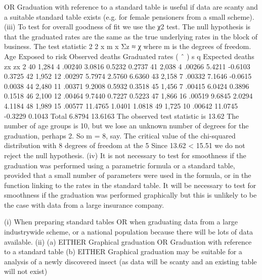 \documentclass[a4paper,12pt]{article}
\begin{document}
OR
Graduation with reference to a standard table is useful if data are scanty and a
suitable standard table exists (e.g. for female pensioners from a small scheme).
(iii) To test for overall goodness of fit we use the χ2 test.
The null hypothesis is that the graduated rates are the same as the true underlying
rates in the block of business.
The test statistic 2 2
x m
x
Σz ≈ χ where m is the degrees of freedom.
Age Exposed
to risk
Observed
deaths
Graduated
rates ( ˆ ) s q
Expected
deaths
zx zx
2
40 1,284 4 .00240 3.0816 0.5232 0.2737
41 2,038 4 .00266 5.4211 -0.6103 0.3725
42 1,952 12 .00297 5.7974 2.5760 6.6360
43 2,158 7 .00332 7.1646 -0.0615 0.0038
44 2,480 11 .00371 9.2008 0.5932 0.3518
45 1,456 7 .00415 6.0424 0.3896 0.1518
46 2,100 12 .00464 9.7440 0.7227 0.5223
47 1,866 16 .00519 9.6845 2.0294 4.1184
48 1,989 15 .00577 11.4765 1.0401 1.0818
49 1,725 10 .00642 11.0745 -0.3229 0.1043
Total 6.8794 13.6163
The observed test statistic is 13.62
The number of age groups is 10, but we lose an unknown number of degrees for the
graduation, perhaps 2. So m = 8, say.
The critical value of the chi-squared distribution with 8 degrees of
freedom at the 5%
Since 13.62 < 15.51
we do not reject the null hypothesis.
(iv) It is not necessary to test for smoothness if the graduation was performed using a
parametric formula or a standard table, provided that a small number of parameters
were used in the formula, or in the function linking to the rates in the standard table.
It will be necessary to test for smoothness if the graduation was performed graphically
but this is unlikely to be the case with data from a large insurance company.

(i) When preparing standard tables OR when graduating data from a large industrywide
scheme, or a national population
because there will be lots of data available.
(ii) (a) EITHER Graphical graduation OR Graduation with reference to a standard
table
(b) EITHER
Graphical graduation may be suitable for a analysis of a newly discovered
insect (as data will be scanty and an existing table will not exist)
\end{document}
